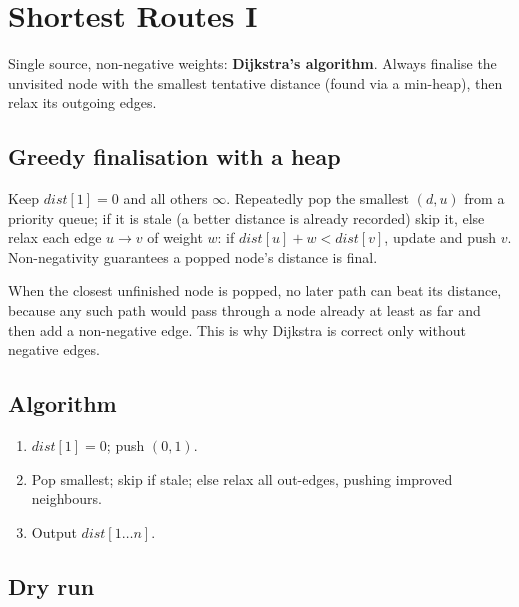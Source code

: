 \section{Shortest Routes I}
\label{sec:cses-shortest-routes-i}


\begin{patternbox}
Single source, non-negative weights: \textbf{Dijkstra's algorithm}. Always
finalise the unvisited node with the smallest tentative distance (found via
a min-heap), then relax its outgoing edges.
\end{patternbox}

\subsection*{Greedy finalisation with a heap}

Keep $\textit{dist}[1]=0$ and all others $\infty$. Repeatedly pop the
smallest $(\textit{d},u)$ from a priority queue; if it is stale (a better
distance is already recorded) skip it, else relax each edge $u\to v$ of
weight $w$: if $\textit{dist}[u]+w<\textit{dist}[v]$, update and push $v$.
Non-negativity guarantees a popped node's distance is final.

\begin{ideabox}
When the closest unfinished node is popped, no later path can beat its
distance, because any such path would pass through a node already at least
as far and then add a non-negative edge. This is why Dijkstra is correct
only without negative edges.
\end{ideabox}

\subsection*{Algorithm}

\begin{enumerate}
  \item $\textit{dist}[1]=0$; push $(0,1)$.
  \item Pop smallest; skip if stale; else relax all out-edges, pushing
        improved neighbours.
  \item Output $\textit{dist}[1\ldots n]$.
\end{enumerate}

\subsection*{Dry run}

